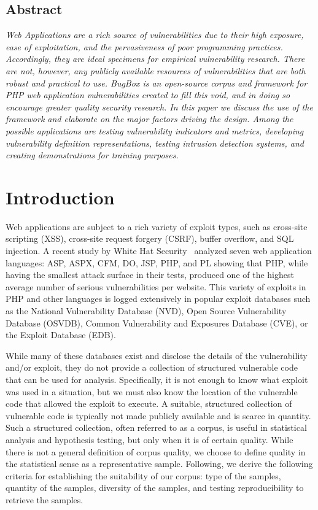 \documentclass[letterpaper,twocolumn,10pt]{article}
\begin{document}
\subsection*{Abstract}
\textit{
Web Applications are a rich source of vulnerabilities due to their high exposure, ease of exploitation, and the pervasiveness of poor programming practices. Accordingly, they are ideal specimens for empirical vulnerability research. There are not, however, any publicly available resources of vulnerabilities that are both robust and practical to use. BugBox is an open-source corpus and framework for PHP web application vulnerabilities created to fill this void, and in doing so encourage greater quality security research. In this paper we discuss the use of the framework and elaborate on the major factors driving the design. Among the possible applications are testing vulnerability indicators and metrics, developing vulnerability definition representations, testing intrusion detection systems, and creating demonstrations for training purposes.  
}

\section{Introduction}
Web applications are subject to a rich variety of exploit types, such as cross-site scripting (XSS), cross-site request forgery (CSRF), buffer overflow, and SQL injection.  A recent study by White Hat Security~\cite{WhiteHat:2010:Online} analyzed seven web application languages: ASP, ASPX, CFM, DO, JSP, PHP, and PL showing that PHP, while having the smallest attack surface in their tests, produced one of the highest average number of serious vulnerabilities per website.  This variety of exploits in PHP and other languages is logged extensively in popular exploit databases such as the National Vulnerability Database (NVD), Open Source Vulnerability Database (OSVDB), Common Vulnerability and Exposures Database (CVE), or the Exploit Database (EDB).\par

While many of these databases exist and disclose the details of the vulnerability and/or exploit, they do not provide a collection of structured vulnerable code that can be used for analysis.  Specifically, it is not enough to know what exploit was used in a situation, but we must also know the location of the vulnerable code that allowed the exploit to execute.  A suitable, structured collection of vulnerable code is typically not made publicly available and is scarce in quantity.  Such a structured collection, often referred to as a corpus, is useful in statistical analysis and hypothesis testing, but only when it is of certain quality.  While there is not a general definition of corpus quality, we choose to define quality in the statistical sense as a representative sample.  Following, we derive the following criteria for establishing the suitability of our corpus: type of the samples, quantity of the samples, diversity of the samples, and testing reproducibility to retrieve the samples.\par
\end{document}
